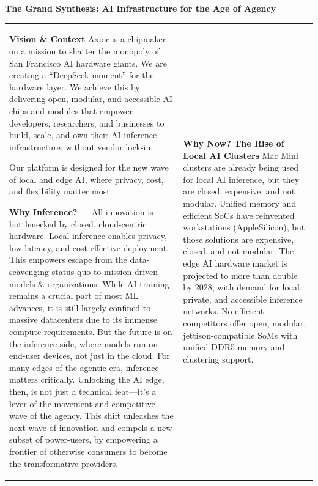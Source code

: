 \documentclass[12pt]{article}
\begin{document}
\setcounter{secnumdepth}{0} %
\pagestyle{plain} %

\begin{center}
    {\brochuretitle\Huge\bfseries\color{axiorMagenta} The Grand Synthesis: AI Infrastructure for the Age of Agency}
\end{center}
\vspace{1em}

\begin{tabularx}{\textwidth}{@{}X X@{}}
\textbf{\large Vision \& Context}\newline
Axior is a chipmaker on a mission to shatter the monopoly of San Francisco AI hardware giants. We are creating a “DeepSeek moment” for the hardware layer. We achieve this by delivering open, modular, and accessible AI chips and modules that empower developers, researchers, and businesses to build, scale, and own their AI inference infrastructure, without vendor lock-in.

Our platform is designed for the new wave of local and edge AI, where privacy, cost, and flexibility matter most.

\scriptsize\textbf{Why Inference?} --- All innovation is bottlenecked by closed, cloud-centric hardware. Local inference enables privacy, low-latency, and cost-effective deployment. This empowers escape from the data-scavenging status quo to mission-driven models \& organizations. While AI training remains a crucial part of most ML advances, it is still largely confined to massive datacenters due to its immense compute requirements. But the future is on the inference side, where models run on end-user devices, not just in the cloud. For many edges of the agentic era, inference matters critically. Unlocking the AI edge, then, is not just a technical feat---it’s a lever of the movement and competitive wave of the agency. This shift unleashes the next wave of innovation and compels a new subset of power-users, by empowering a frontier of otherwise consumers to become the transformative providers.
&
\textbf{\large Why Now? The Rise of Local AI Clusters}\newline
\scriptsize Mac Mini clusters are already being used for local AI inference, but they are closed, expensive, and not modular. Unified memory and efficient SoCs have reinvented workstations (AppleSilicon), but those solutions are expensive, closed, and not modular. The edge AI hardware market is projected to more than double by 2028, with demand for local, private, and accessible inference networks. No efficient competitors offer open, modular, jettison-compatible SoMs with unified DDR5 memory and clustering support.
\end{tabularx}
\end{document}
